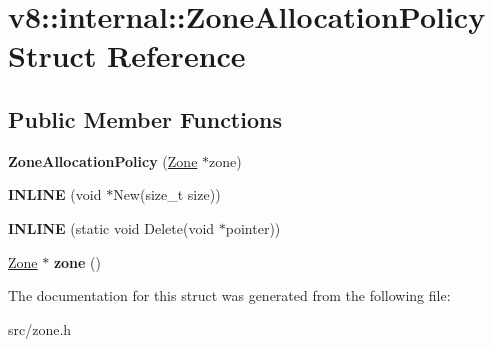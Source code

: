 \hypertarget{structv8_1_1internal_1_1_zone_allocation_policy}{}\section{v8\+:\+:internal\+:\+:Zone\+Allocation\+Policy Struct Reference}
\label{structv8_1_1internal_1_1_zone_allocation_policy}
\subsection*{Public Member Functions}
\begin{DoxyCompactItemize}
\item 
\hypertarget{structv8_1_1internal_1_1_zone_allocation_policy_a37f5884ffaf08def2a33fc91947ae68f}{}{\bfseries Zone\+Allocation\+Policy} (\hyperlink{classv8_1_1internal_1_1_zone}{Zone} $\ast$zone)\label{structv8_1_1internal_1_1_zone_allocation_policy_a37f5884ffaf08def2a33fc91947ae68f}

\item 
\hypertarget{structv8_1_1internal_1_1_zone_allocation_policy_abde163e4bb4b8caac69eb030242e1f1a}{}{\bfseries I\+N\+L\+I\+N\+E} (void $\ast$New(size\+\_\+t size))\label{structv8_1_1internal_1_1_zone_allocation_policy_abde163e4bb4b8caac69eb030242e1f1a}

\item 
\hypertarget{structv8_1_1internal_1_1_zone_allocation_policy_aaf5f940887f952921fc936f9f00a7fa8}{}{\bfseries I\+N\+L\+I\+N\+E} (static void Delete(void $\ast$pointer))\label{structv8_1_1internal_1_1_zone_allocation_policy_aaf5f940887f952921fc936f9f00a7fa8}

\item 
\hypertarget{structv8_1_1internal_1_1_zone_allocation_policy_afbab1dde4892ce880a446b1fbdb55a43}{}\hyperlink{classv8_1_1internal_1_1_zone}{Zone} $\ast$ {\bfseries zone} ()\label{structv8_1_1internal_1_1_zone_allocation_policy_afbab1dde4892ce880a446b1fbdb55a43}

\end{DoxyCompactItemize}


The documentation for this struct was generated from the following file\+:\begin{DoxyCompactItemize}
\item 
src/zone.\+h\end{DoxyCompactItemize}
